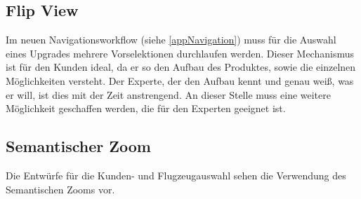 \subsection{Flip View}
Im neuen Navigationsworkflow (siehe \ref{appNavigation}) muss für die Auswahl eines Upgrades mehrere Vorselektionen durchlaufen werden. Dieser Mechanismus ist für den Kunden ideal, da er so den Aufbau des Produktes, sowie die einzelnen Möglichkeiten versteht. Der Experte, der den Aufbau kennt und genau weiß, was er will, ist dies mit der Zeit anstrengend. An dieser Stelle muss eine weitere Möglichkeit geschaffen werden, die für den Experten geeignet ist. 

\subsection{Semantischer Zoom}
Die Entwürfe für die Kunden- und Flugzeugauswahl sehen die Verwendung des Semantischen Zooms vor. 

